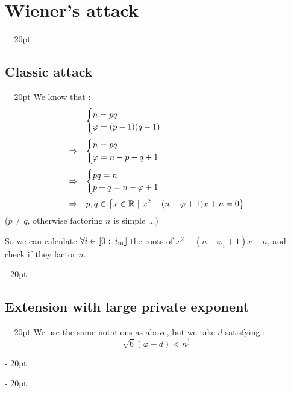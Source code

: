 \documentclass[a4paper, 12pt, twoside]{article}
\newcommand{\R}{\mathbb{R}} %
\newcommand{\nset}[2]{\left\llbracket #1\ ;\ #2 \right\rrbracket}
\newcommand{\set}[1]{\left\{ #1 \right\}}
\newcommand{\ind}[1][20pt]{\advance\leftskip + #1}
\newcommand{\deind}[1][20pt]{\advance\leftskip - #1}
\newenvironment{indt}[2][20pt]{#2 \par \ind[#1]}{\par \deind} %
\begin{document}
\begin{indt}{\section{Wiener's attack}}
\begin{indt}{\subsection{Classic attack}}
            We know that :
            \[
                \begin{array}{rl}
                    &
                    \begin{cases}
                        n = pq
                        \\
                        \varphi = (p - 1)(q - 1)
                    \end{cases}
                    \vspace{6pt}
                    \\
                    \Rightarrow
                    &
                    \begin{cases}
                        n = pq
                        \\
                        \varphi = n - p - q + 1
                    \end{cases}
                    \vspace{6pt}
                    \\
                    \Rightarrow
                    &
                    \begin{cases}
                        pq = n
                        \\
                        p + q = n - \varphi + 1
                    \end{cases}
                    \vspace{6pt}
                    \\
                    \Rightarrow
                    &
                    p, q \in \set{x \in \R\ |\ x^2 - (n - \varphi + 1)x + n = 0}
                \end{array}
            \]
            ($p \neq q$, otherwise factoring $n$ is simple ...)
            
            So we can calculate $\forall i \in \nset 0 {i_{\rm m}}$ the roots of $x^2 - (n - \varphi_i + 1)x + n$, and check if they factor $n$.
        \end{indt}

        \vspace{12pt}
        
        \begin{indt}{\subsection{Extension with large private exponent}}
            We use the same notations as above, but we take $d$ satisfying :
            \[
                \sqrt 6 (\varphi - d) < n^{\tfrac 1 4}
            \]


\end{indt}
\end{indt}
\end{document}
